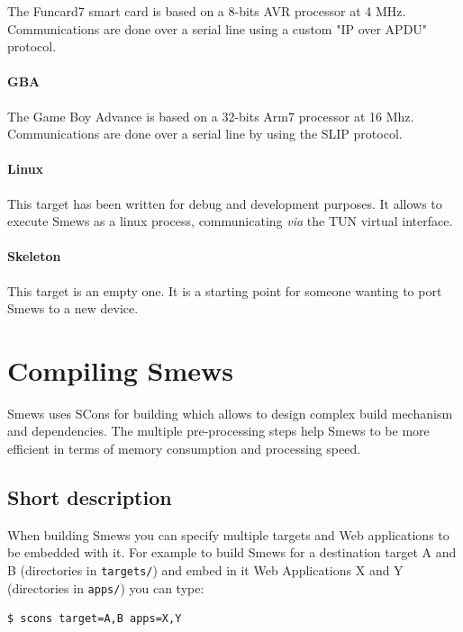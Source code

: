 \documentclass{report}
\begin{document}
The Funcard7 smart card is based on a 8-bits AVR processor at 4 MHz. Communications are done over a serial line using a custom "IP over APDU" protocol.

\paragraph{GBA}

The Game Boy Advance is based on a 32-bits Arm7 processor at 16 Mhz. Communications are done over a serial line by using the SLIP protocol.

\paragraph{Linux}

This target has been written for debug and development purposes. It allows to execute Smews as a linux process, communicating {\it via} the TUN virtual interface.

\paragraph{Skeleton}

This target is an empty one. It is a starting point for someone wanting to port Smews to a new device.

\section{Compiling Smews}
\label{sec:compile}

Smews uses SCons for building which allows to design complex build mechanism and dependencies. The multiple pre-processing steps help Smews to be more efficient in terms of memory consumption and processing speed.

\subsection{Short description}

When building Smews you can specify multiple targets and Web applications to be embedded with it. For example to build Smews for a destination target A and B (directories in \verb+targets/+) and embed in it Web Applications X and Y (directories in \verb+apps/+) you can type:

\begin{verbatim}
$ scons target=A,B apps=X,Y
\end{verbatim}
\end{document}
